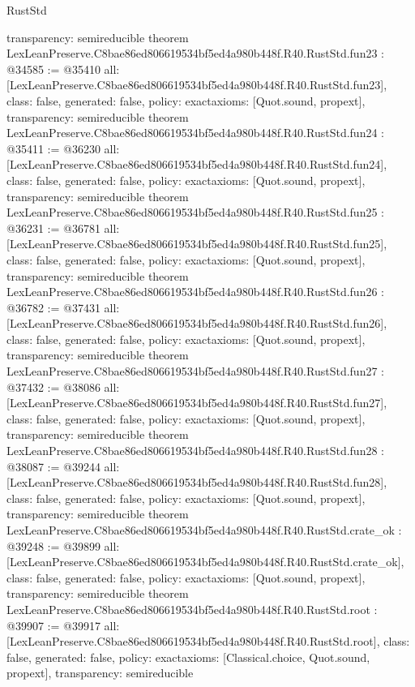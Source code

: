 \begin{lexlean}{RustStd}
\begin{coremodule}
{  transparency: semireducible
}
theorem LexLeanPreserve.C8bae86ed806619534bf5ed4a980b448f.R40.RustStd.fun23 : @34585 := @35410 {
  all: [LexLeanPreserve.C8bae86ed806619534bf5ed4a980b448f.R40.RustStd.fun23],
  class: false,
  generated: false,
  policy: exact{axioms: [Quot.sound, propext]},
  transparency: semireducible
}
theorem LexLeanPreserve.C8bae86ed806619534bf5ed4a980b448f.R40.RustStd.fun24 : @35411 := @36230 {
  all: [LexLeanPreserve.C8bae86ed806619534bf5ed4a980b448f.R40.RustStd.fun24],
  class: false,
  generated: false,
  policy: exact{axioms: [Quot.sound, propext]},
  transparency: semireducible
}
theorem LexLeanPreserve.C8bae86ed806619534bf5ed4a980b448f.R40.RustStd.fun25 : @36231 := @36781 {
  all: [LexLeanPreserve.C8bae86ed806619534bf5ed4a980b448f.R40.RustStd.fun25],
  class: false,
  generated: false,
  policy: exact{axioms: [Quot.sound, propext]},
  transparency: semireducible
}
theorem LexLeanPreserve.C8bae86ed806619534bf5ed4a980b448f.R40.RustStd.fun26 : @36782 := @37431 {
  all: [LexLeanPreserve.C8bae86ed806619534bf5ed4a980b448f.R40.RustStd.fun26],
  class: false,
  generated: false,
  policy: exact{axioms: [Quot.sound, propext]},
  transparency: semireducible
}
theorem LexLeanPreserve.C8bae86ed806619534bf5ed4a980b448f.R40.RustStd.fun27 : @37432 := @38086 {
  all: [LexLeanPreserve.C8bae86ed806619534bf5ed4a980b448f.R40.RustStd.fun27],
  class: false,
  generated: false,
  policy: exact{axioms: [Quot.sound, propext]},
  transparency: semireducible
}
theorem LexLeanPreserve.C8bae86ed806619534bf5ed4a980b448f.R40.RustStd.fun28 : @38087 := @39244 {
  all: [LexLeanPreserve.C8bae86ed806619534bf5ed4a980b448f.R40.RustStd.fun28],
  class: false,
  generated: false,
  policy: exact{axioms: [Quot.sound, propext]},
  transparency: semireducible
}
theorem LexLeanPreserve.C8bae86ed806619534bf5ed4a980b448f.R40.RustStd.crate_ok : @39248 := @39899 {
  all: [LexLeanPreserve.C8bae86ed806619534bf5ed4a980b448f.R40.RustStd.crate_ok],
  class: false,
  generated: false,
  policy: exact{axioms: [Quot.sound, propext]},
  transparency: semireducible
}
theorem LexLeanPreserve.C8bae86ed806619534bf5ed4a980b448f.R40.RustStd.root : @39907 := @39917 {
  all: [LexLeanPreserve.C8bae86ed806619534bf5ed4a980b448f.R40.RustStd.root],
  class: false,
  generated: false,
  policy: exact{axioms: [Classical.choice, Quot.sound, propext]},
  transparency: semireducible
}


\end{coremodule}
\end{lexlean}

